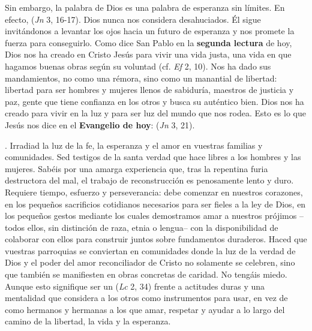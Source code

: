 \begin{body}
Sin embargo, la palabra de Dios es una palabra de esperanza sin límites. En efecto,  (\textit{Jn} 3, 16-17). Dios nunca nos considera desahuciados. Él sigue invitándonos a levantar los ojos hacia un futuro de esperanza y nos promete la fuerza para conseguirlo. Como dice San Pablo en la \textbf{segunda lectura} de hoy, Dios nos ha creado en Cristo Jesús para vivir una vida justa, una vida en que hagamos buenas obras según su voluntad (cf. \textit{Ef} 2, 10). Nos ha dado sus mandamientos, no como una rémora, sino como un manantial de libertad: libertad para ser hombres y mujeres llenos de sabiduría, maestros de justicia y paz, gente que tiene confianza en los otros y busca su auténtico bien. Dios nos ha creado para vivir en la luz y para ser luz del mundo que nos rodea. Esto es lo que Jesús nos dice en el \textbf{Evangelio de hoy}:  (\textit{Jn} 3, 21).

. Irradiad la luz de la fe, la esperanza y el amor en vuestras familias y comunidades. Sed testigos de la santa verdad que hace libres a los hombres y las mujeres. Sabéis por una amarga experiencia que, tras la repentina furia destructora del mal, el trabajo de reconstrucción es penosamente lento y duro. Requiere tiempo, esfuerzo y perseverancia: debe comenzar en nuestros corazones, en los pequeños sacrificios cotidianos necesarios para ser fieles a la ley de Dios, en los pequeños gestos mediante los cuales demostramos amar a nuestros prójimos –todos ellos, sin distinción de raza, etnia o lengua– con la disponibilidad de colaborar con ellos para construir juntos sobre fundamentos duraderos. Haced que vuestras parroquias se conviertan en comunidades donde la luz de la verdad de Dios y el poder del amor reconciliador de Cristo no solamente se celebren, sino que también se manifiesten en obras concretas de caridad. No tengáis miedo. Aunque esto signifique ser un  (\textit{Lc} 2, 34) frente a actitudes duras y una mentalidad que considera a los otros como instrumentos para usar, en vez de como hermanos y hermanas a los que amar, respetar y ayudar a lo largo del camino de la libertad, la vida y la esperanza.


\end{body}
